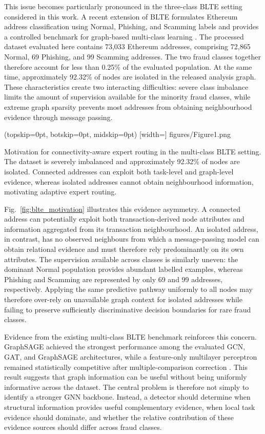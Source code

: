 \documentclass{ieeeaccess}
\begin{document}
This issue becomes particularly pronounced in the three-class BLTE setting considered in this work. A recent extension of BLTE formulates Ethereum address classification using Normal, Phishing, and Scamming labels and provides a controlled benchmark for graph-based multi-class learning \cite{alemari2026multiclass}. The processed dataset evaluated here contains 73,033 Ethereum addresses, comprising 72,865 Normal, 69 Phishing, and 99 Scamming addresses. The two fraud classes together therefore account for less than 0.25\% of the evaluated population. At the same time, approximately 92.32\% of nodes are isolated in the released analysis graph. These characteristics create two interacting difficulties: severe class imbalance limits the amount of supervision available for the minority fraud classes, while extreme graph sparsity prevents most addresses from obtaining neighbourhood evidence through message passing.

\Figure[t!](topskip=0pt, botskip=0pt, midskip=0pt)
[width=\textwidth]
{figures/Figure1.png}
{\parbox[t]{0.86\textwidth}{\raggedright
Motivation for connectivity-aware expert routing in the multi-class BLTE setting. The dataset is severely imbalanced and approximately 92.32\% of nodes are isolated. Connected addresses can exploit both task-level and graph-level evidence, whereas isolated addresses cannot obtain neighbourhood information, motivating adaptive expert routing.
}\label{fig:blte_motivation}}

Fig.~\ref{fig:blte_motivation} illustrates this evidence asymmetry. A connected address can potentially exploit both transaction-derived node attributes and information aggregated from its transaction neighbourhood. An isolated address, in contrast, has no observed neighbours from which a message-passing model can obtain relational evidence and must therefore rely predominantly on its own attributes. The supervision available across classes is similarly uneven: the dominant Normal population provides abundant labelled examples, whereas Phishing and Scamming are represented by only 69 and 99 addresses, respectively. Applying the same predictive pathway uniformly to all nodes may therefore over-rely on unavailable graph context for isolated addresses while failing to preserve sufficiently discriminative decision boundaries for rare fraud classes.

Evidence from the existing multi-class BLTE benchmark reinforces this concern. GraphSAGE achieved the strongest performance among the evaluated GCN, GAT, and GraphSAGE architectures, while a feature-only multilayer perceptron remained statistically competitive after multiple-comparison correction \cite{alemari2026multiclass}. This result suggests that graph information can be useful without being uniformly informative across the dataset. The central problem is therefore not simply to identify a stronger GNN backbone. Instead, a detector should determine when structural information provides useful complementary evidence, when local task evidence should dominate, and whether the relative contribution of these evidence sources should differ across fraud classes.
\end{document}
